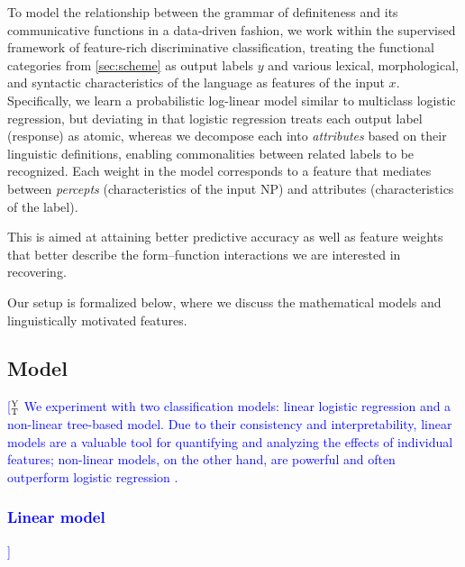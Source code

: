 \documentclass[11pt,letterpaper]{article}
\newcommand{\ensuretext}[1]{#1}
\newcommand{\nssmarker}{\ensuretext{\textcolor{magenta}{\ensuremath{^{\textsc{NS}}_{\textsc{S}}}}}}
\newcommand{\ytmarker}{\ensuretext{\textcolor{blue}{\ensuremath{^{\textsc{Y}}_{\textsc{T}}}}}}
\newcommand{\arkcomment}[3]{\ensuretext{\textcolor{#3}{[#1 #2]}}}
\newcommand{\nss}[1]{\arkcomment{\nssmarker}{#1}{magenta}}
\newcommand{\yt}[1]{\arkcomment{\ytmarker}{#1}{blue}}
\newcommand{\costversion}[1]{}
\begin{document}
To model the relationship between the grammar of definiteness and its communicative functions in a data-driven fashion,
we work within the supervised framework of feature-rich discriminative classification, 
treating the functional categories from \cref{sec:scheme} as output labels $y$
and various lexical, morphological, and syntactic characteristics of the language as features of the input $x$.
Specifically, we learn a probabilistic log-linear model similar to multiclass logistic regression, 
but deviating in that
logistic regression treats each output label (response) as atomic, whereas 
we decompose each into \emph{attributes} based on their linguistic definitions, 
enabling commonalities between related labels to be recognized.
Each weight in the model corresponds to a feature that mediates between 
\emph{percepts} (characteristics of the input NP) and attributes (characteristics of the label).
\costversion{\nss{}the following ways:
\begin{itemize}
  \item Logistic regression treats each output label (response) as atomic; 
  we decompose each into \emph{attributes} based on their linguistic definitions, 
  enabling commonalities between related labels to be recognized.
  Each weight in the model corresponds to a feature that mediates between 
  \emph{percepts} (characteristics of the input NP) and attributes (characteristics of the label).
  \item Logistic regression assumes a prediction is either correct or incorrect.
  We incorporate a \emph{cost function} that gives partial credit during learning when a related label 
  is predicted, so the learned model will better match our evaluation measure.
  \item Logistic regression assumes the space of possible predictions matches 
  the space of labels observed in the training data; we allow more abstract labels to be predicted, 
  which can receive partial credit. The scoring scheme encourages the predictor to ``back off'' 
  to a coarser label if it is not sufficiently confident about a fine-grained label.
\end{itemize}
These decisions are\nss{}}
This is aimed at attaining better predictive accuracy 
as well as feature weights that better describe the form--function interactions we are interested in recovering.

Our setup is formalized below, where we discuss the mathematical models and linguistically motivated features.

\subsection{Model}
\yt{
We experiment with two classification models: linear logistic regression and a non-linear tree-based model. 
Due to their consistency and interpretability, linear models are a valuable tool for quantifying and analyzing the effects of individual features; non-linear models, on the other hand, are powerful and often outperform logistic regression \citep{PerlichEtAl:2003}.
\subsubsection{Linear model}}
\end{document}
